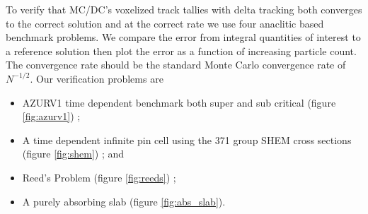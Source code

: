 To verify that MC/DC's voxelized track tallies with delta tracking both converges to the correct solution and at the correct rate we use four anaclitic based benchmark problems.
We compare the error from integral quantities of interest to a reference solution then plot the error as a function of increasing particle count.
The convergence rate should be the standard Monte Carlo convergence rate of $N^{-1/2}$.
Our verification problems are
\begin{itemize}
    \item AZURV1 time dependent benchmark both super and sub critical (figure \ref{fig:azurv1}) \cite{ganapol_homogeneous_2001};
    \item A time dependent infinite pin cell using the 371 group SHEM cross sections (figure \ref{fig:shem}) \cite{hfaiedh_2005_shem}; and 
    \item Reed's Problem (figure \ref{fig:reeds}) \cite{reed_difference_1971};
    \item A purely absorbing slab (figure \ref{fig:abs_slab}).
\end{itemize}
